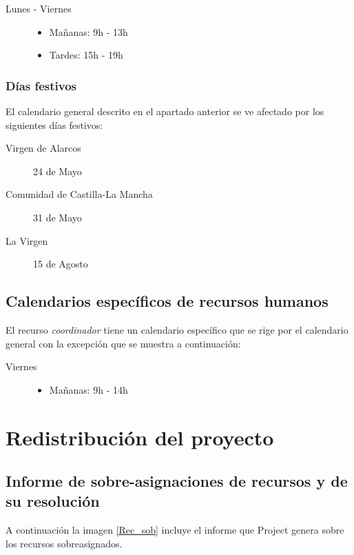 \documentclass[11pt,a4paper,spanish,twoside]{book}
\begin{document}
\begin{description}
\item[Lunes - Viernes] \hfill
  \begin{itemize}
  \item Mañanas: 9h - 13h
  \item Tardes: 15h - 19h
  \end{itemize}
\end{description}

\subsection{Días festivos}
El calendario general descrito en el apartado anterior se ve afectado por los
siguientes días festivos:

\begin{description}
\item[Virgen de Alarcos] 24 de Mayo
\item[Comunidad de Castilla-La Mancha] 31 de Mayo
\item[La Virgen] 15 de Agosto
\end{description}

\section{Calendarios específicos de recursos humanos}
El recurso \emph{coordinador} tiene un calendario específico que se rige por
el calendario general con la excepción que se muestra a continuación:

\begin{description}
\item[Viernes] \hfill
  \begin{itemize}
  \item Mañanas: 9h - 14h
  \end{itemize}
\end{description}


\chapter{Redistribución del proyecto}
\section{Informe de sobre-asignaciones de recursos y de su 
  resolución}
A continuación la imagen \ref{Rec_sob} incluye el informe que Project
genera sobre los recursos sobreasignados.

\end{document}
